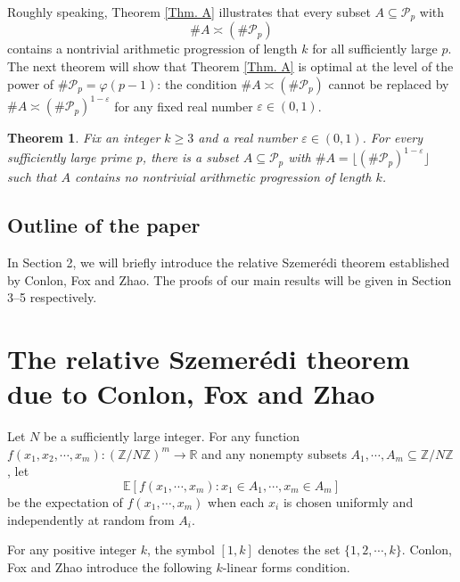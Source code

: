 \documentclass[10pt,a4paper]{amsart}
\newtheorem{theorem}{Theorem}[section]
\begin{document}
		Roughly speaking, Theorem \ref{Thm. A} illustrates that every
		subset $A\subseteq\mathcal P_p$ with 
		$$\#A\asymp (\#\mathcal{P}_p)$$ 
		contains a nontrivial arithmetic progression of length $k$ for all sufficiently large $p$. The next theorem will show that Theorem \ref{Thm. A} is optimal at the level of the power of $\#\mathcal{P}_p=\varphi(p-1)$:  the condition $\#A\asymp (\#\mathcal{P}_p)$ cannot be replaced by $\#A\asymp (\#\mathcal{P}_p)^{1-\varepsilon}$ for any fixed real number $\varepsilon\in(0,1)$. 
	
	
	\begin{theorem}\label{Thm. B}
		Fix an integer $k\ge3$ and a real number $\varepsilon\in(0,1)$. For every sufficiently large prime $p$, there is a subset $A\subseteq\mathcal{P}_p$ with $\#A=\lfloor (\#\mathcal{P}_p)^{1-\varepsilon}\rfloor$ such that $A$ contains no nontrivial arithmetic progression of length $k$.
	\end{theorem}
	
	
	\subsection{Outline of the paper} In Section 2, we will briefly introduce the relative Szemer\'edi theorem established by Conlon, Fox and Zhao. The proofs of our main results will be given in Section 3--5 respectively. 
	
	\section{The relative Szemer\'edi theorem due to Conlon, Fox and Zhao}
	\setcounter{lemma}{0}
	\setcounter{theorem}{0}
	\setcounter{equation}{0}
	\setcounter{conjecture}{0}
	\setcounter{remark}{0}
	\setcounter{corollary}{0}
	
	Let $N$ be a sufficiently large integer. For any function $f(x_1,x_2,\cdots, x_m): \left(\mathbb{Z}/N\mathbb{Z}\right)^m\rightarrow\mathbb{R}$ and any nonempty subsets $A_1,\cdots,A_m\subseteq \mathbb{Z}/N\mathbb{Z}$, let 
	$$\mathbb{E}\left[f(x_1,\cdots,x_m): x_1\in A_1,\cdots, x_m\in A_m\right]$$
	be the expectation of $f(x_1,\cdots,x_m)$ when each $x_i$ is chosen uniformly and independently at random from $A_i$. 
	
	For any positive integer $k$, the symbol $[1,k]$ denotes the set $\{1,2,\cdots, k\}$. Conlon, Fox and Zhao  \cite[Definition 2.2]{CFZ} introduce the following $k$-linear forms condition.
	
\end{document}
